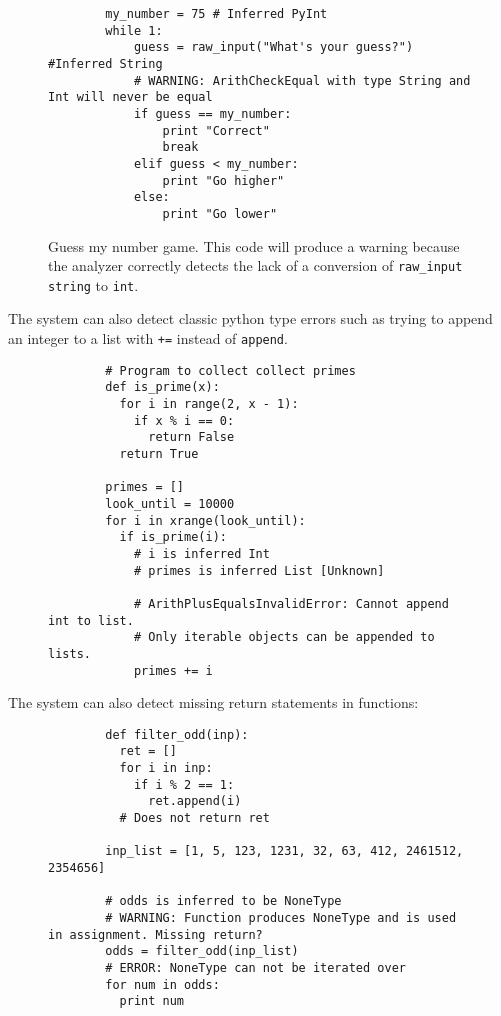 \documentclass{article}[12pt]
\begin{document}
\begin{figure}
    \begin{verbatim}
        my_number = 75 # Inferred PyInt
        while 1:
            guess = raw_input("What's your guess?") #Inferred String
            # WARNING: ArithCheckEqual with type String and Int will never be equal 
            if guess == my_number:
                print "Correct"
                break
            elif guess < my_number:
                print "Go higher"
            else:
                print "Go lower"
    \end{verbatim}
    \caption{Guess my number game. This code will produce a warning because the analyzer correctly
        detects the lack of a conversion of \texttt{raw\_input} \texttt{string} to \texttt{int}.}
\end{figure}

The system can also detect classic python type errors such as trying to append an integer to a list
with \texttt{+=} instead of \texttt{append}.
\begin{figure}
    \begin{verbatim}
        # Program to collect collect primes
        def is_prime(x):
          for i in range(2, x - 1):
            if x % i == 0:
              return False
          return True
        
        primes = []
        look_until = 10000
        for i in xrange(look_until):
          if is_prime(i):
            # i is inferred Int
            # primes is inferred List [Unknown]

            # ArithPlusEqualsInvalidError: Cannot append int to list. 
            # Only iterable objects can be appended to lists.
            primes += i
    \end{verbatim}
\end{figure}

The system can also detect missing return statements in functions:
\begin{figure}
    \begin{verbatim}
        def filter_odd(inp):
          ret = []
          for i in inp:
            if i % 2 == 1:
              ret.append(i)
          # Does not return ret

        inp_list = [1, 5, 123, 1231, 32, 63, 412, 2461512, 2354656]

        # odds is inferred to be NoneType
        # WARNING: Function produces NoneType and is used in assignment. Missing return?
        odds = filter_odd(inp_list)
        # ERROR: NoneType can not be iterated over
        for num in odds:
          print num
    
    \end{verbatim}
\end{figure}

       
\end{document}
